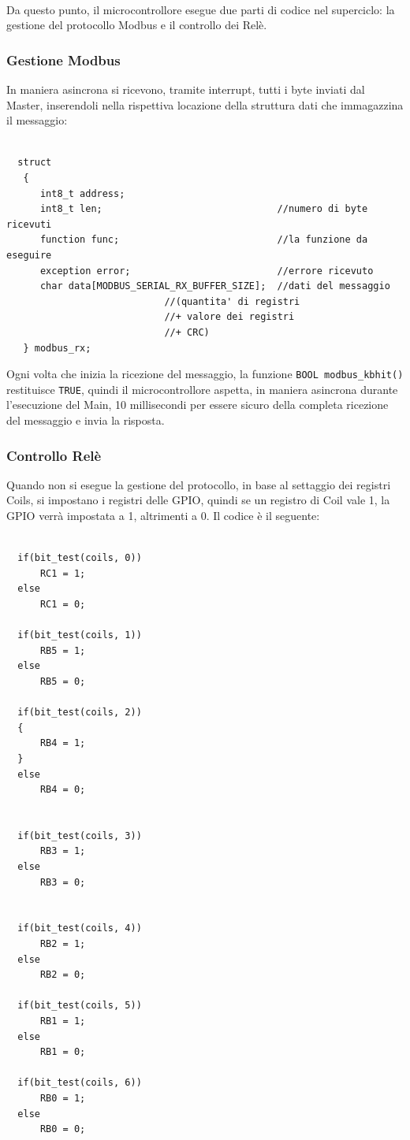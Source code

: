 \documentclass[a4paper,titlepage]{book}
\begin{document}
~

Da questo punto, il microcontrollore esegue due parti di codice nel superciclo: la gestione del protocollo Modbus e il controllo dei Relè.

\subsubsection{Gestione Modbus}

In maniera asincrona si ricevono, tramite interrupt, tutti i byte inviati dal Master, inserendoli nella rispettiva locazione della struttura dati che immagazzina il messaggio:

\begin{lstlisting}

  struct
   {
      int8_t address;
      int8_t len;                              	//numero di byte ricevuti
      function func;                           	//la funzione da eseguire
      exception error;                         	//errore ricevuto
      char data[MODBUS_SERIAL_RX_BUFFER_SIZE]; 	//dati del messaggio 
      						//(quantita' di registri 
      						//+ valore dei registri
      						//+ CRC)
   } modbus_rx;

\end{lstlisting}

Ogni volta che inizia la ricezione del messaggio, la funzione \lstinline!BOOL modbus_kbhit()! restituisce \lstinline!TRUE!, quindi il microcontrollore aspetta, in maniera asincrona durante l'esecuzione del Main, 10 millisecondi per essere sicuro della completa ricezione del messaggio e invia la risposta.

\subsubsection{Controllo Relè}

Quando non si esegue la gestione del protocollo, in base al settaggio dei registri Coils, si impostano i registri delle GPIO, quindi se un registro di Coil vale 1, la GPIO verrà impostata a 1, altrimenti a 0. Il codice è il seguente:

\begin{lstlisting}

  if(bit_test(coils, 0))
      RC1 = 1;
  else
      RC1 = 0;

  if(bit_test(coils, 1))
      RB5 = 1;
  else
      RB5 = 0;

  if(bit_test(coils, 2))
  {
      RB4 = 1;
  }
  else
      RB4 = 0;


  if(bit_test(coils, 3))
      RB3 = 1;
  else
      RB3 = 0;


  if(bit_test(coils, 4))
      RB2 = 1;
  else
      RB2 = 0;

  if(bit_test(coils, 5))
      RB1 = 1;
  else
      RB1 = 0;

  if(bit_test(coils, 6))
      RB0 = 1;
  else
      RB0 = 0;

\end{lstlisting}
\end{document}
